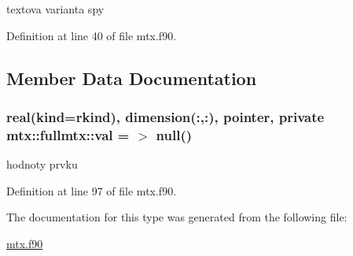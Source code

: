textova varianta spy 



\-Definition at line 40 of file mtx.\-f90.



\subsection{\-Member \-Data \-Documentation}
\hypertarget{structmtx_1_1fullmtx_a5afa79f4180ded442b60ee854b636b36}{
\subsubsection[{val}]{\setlength{\rightskip}{0pt plus 5cm}real(kind=rkind), dimension(\-:,\-:), pointer, private {\bf mtx\-::fullmtx\-::val} = $>$ null()}}\label{structmtx_1_1fullmtx_a5afa79f4180ded442b60ee854b636b36}


hodnoty prvku 



\-Definition at line 97 of file mtx.\-f90.



\-The documentation for this type was generated from the following file\-:\begin{DoxyCompactItemize}
\item 
\hyperlink{mtx_8f90}{mtx.\-f90}\end{DoxyCompactItemize}
